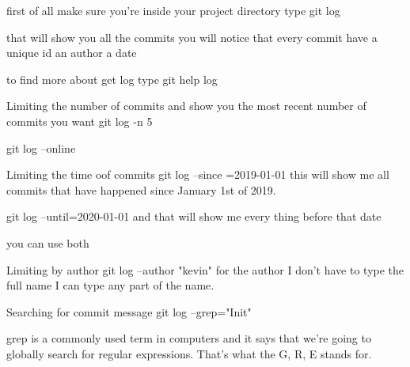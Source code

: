 first of all make sure you're inside your project directory 
type   
  git log 

that will show you all the commits 
you will notice that every commit have 
a unique id 
an author 
a date 

to find more about get log type
  git help log

Limiting the number of commits and show you the most recent number of commits you want 
  git log -n 5 

  git log --online 

Limiting the time oof commits 
  git log --since =2019-01-01
  this will show me all commits that have happened since January 1st of 2019.

  git log --until=2020-01-01 
  and that will show me every thing before that date 

  you can use both 

Limiting by author 
  git log --author "kevin"
  for the author I don't have to type the full name I can type any part of the name.

Searching for commit message 
  git log --grep="Init"

  grep is a commonly used term in computers and it says that 
  we're going to globally search for regular expressions. 
  That's what the G, R, E stands for.  